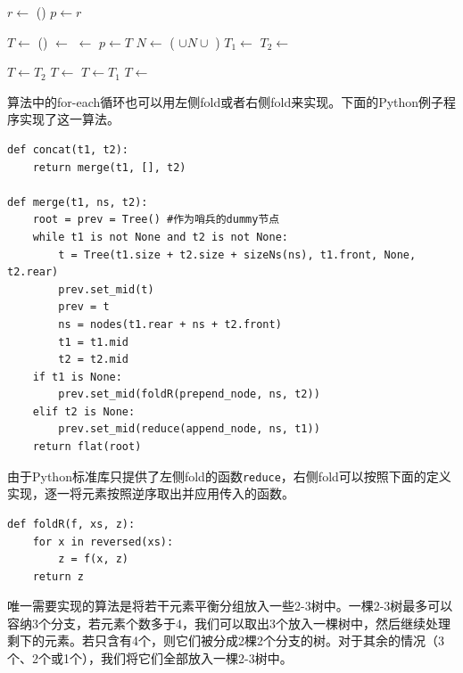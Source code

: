 \documentclass[b5paper]{ctexart}
\begin{document}
\begin{algorithmic}
  \State \Return {}
\EndFunction
\Statex
{}
  \State $r \gets$ ()
  \State $p \gets r$

    \State $T \gets$ ()
    \State {} $\gets$ 
    \State {} $\gets$ 
    \State {}
    \State $p \gets T$
    \State $N \gets$ ( $\cup N \cup$ )
    \State $T_1 \gets$ 
    \State $T_2 \gets$ 
  \EndWhile

    \State $T \gets T_2$
      \State $T \gets$ 
    \EndFor
    \State $T \gets T_1$
      \State $T \gets$ 
    \EndFor
  \EndIf
  \State {}

  \State \Return {}
\EndFunction
\end{algorithmic}

算法中的for-each循环也可以用左侧fold或者右侧fold来实现。下面的Python例子程序实现了这一算法。

\lstset{language=Python}
\begin{lstlisting}
def concat(t1, t2):
    return merge(t1, [], t2)

def merge(t1, ns, t2):
    root = prev = Tree() #作为哨兵的dummy节点
    while t1 is not None and t2 is not None:
        t = Tree(t1.size + t2.size + sizeNs(ns), t1.front, None, t2.rear)
        prev.set_mid(t)
        prev = t
        ns = nodes(t1.rear + ns + t2.front)
        t1 = t1.mid
        t2 = t2.mid
    if t1 is None:
        prev.set_mid(foldR(prepend_node, ns, t2))
    elif t2 is None:
        prev.set_mid(reduce(append_node, ns, t1))
    return flat(root)
\end{lstlisting}

由于Python标准库只提供了左侧fold的函数\texttt{reduce}，右侧fold可以按照下面的定义实现，逐一将元素按照逆序取出并应用传入的函数。

\begin{lstlisting}
def foldR(f, xs, z):
    for x in reversed(xs):
        z = f(x, z)
    return z
\end{lstlisting}

唯一需要实现的算法是将若干元素平衡分组放入一些2-3树中。一棵2-3树最多可以容纳3个分支，若元素个数多于4，我们可以取出3个放入一棵树中，然后继续处理剩下的元素。若只含有4个，则它们被分成2棵2个分支的树。对于其余的情况（3个、2个或1个），我们将它们全部放入一棵2-3树中。
\end{document}
